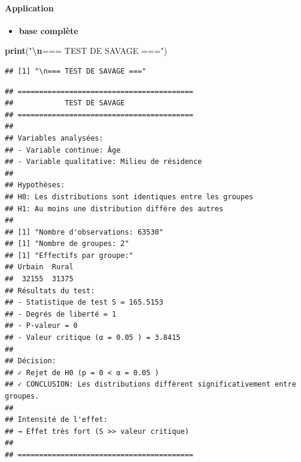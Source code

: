 \documentclass[
  12pt,
]{article}
\newenvironment{Shaded}{\begin{snugshade}}{\end{snugshade}}
\newcommand{\AttributeTok}[1]{\textcolor[rgb]{0.13,0.29,0.53}{#1}}
\newcommand{\FloatTok}[1]{\textcolor[rgb]{0.00,0.00,0.81}{#1}}
\newcommand{\FunctionTok}[1]{\textcolor[rgb]{0.13,0.29,0.53}{\textbf{#1}}}
\newcommand{\NormalTok}[1]{#1}
\newcommand{\OtherTok}[1]{\textcolor[rgb]{0.56,0.35,0.01}{#1}}
\newcommand{\SpecialCharTok}[1]{\textcolor[rgb]{0.81,0.36,0.00}{\textbf{#1}}}
\newcommand{\StringTok}[1]{\textcolor[rgb]{0.31,0.60,0.02}{#1}}
\providecommand{\tightlist}{%
  \setlength{\itemsep}{0pt}\setlength{\parskip}{0pt}}
\begin{document}
\paragraph{Application}\label{application}

\begin{itemize}
\tightlist
\item
  \textbf{base complète}
\end{itemize}

\begin{Shaded}
\begin{Highlighting}[]
\FunctionTok{print}\NormalTok{(}\StringTok{"}\SpecialCharTok{\textbackslash{}n}\StringTok{=== TEST DE SAVAGE ==="}\NormalTok{)}
\end{Highlighting}
\end{Shaded}

\begin{verbatim}
## [1] "\n=== TEST DE SAVAGE ==="
\end{verbatim}

\begin{Shaded}
\end{Shaded}

\begin{verbatim}
## =========================================
##            TEST DE SAVAGE
## =========================================
## 
## Variables analysées:
## - Variable continue: Âge 
## - Variable qualitative: Milieu de résidence 
## 
## Hypothèses:
## H0: Les distributions sont identiques entre les groupes
## H1: Au moins une distribution diffère des autres
## 
## [1] "Nombre d'observations: 63530"
## [1] "Nombre de groupes: 2"
## [1] "Effectifs par groupe:"
## Urbain  Rural 
##  32155  31375 
## Résultats du test:
## - Statistique de test S = 165.5153 
## - Degrés de liberté = 1 
## - P-valeur = 0 
## - Valeur critique (α = 0.05 ) = 3.8415 
## 
## Décision:
## ✓ Rejet de H0 (p = 0 < α = 0.05 )
## ✓ CONCLUSION: Les distributions diffèrent significativement entre groupes.
## 
## Intensité de l'effet:
## → Effet très fort (S >> valeur critique)
## 
## =========================================
\end{verbatim}
\end{document}
